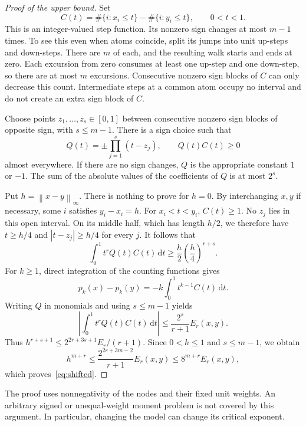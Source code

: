 \documentclass[11pt,a4paper]{article}
\numberwithin{equation}{section}
\theoremstyle{definition}
\theoremstyle{remark}
\newcommand{\dd}{\,\mathrm d}
\newcommand{\norm}[1]{\left\lVert#1\right\rVert}
\newcommand{\abs}[1]{\left|#1\right|}
\begin{document}
\begin{proof}[Proof of the upper bound]
Set
\[
 C(t)=\#\{i:x_i\le t\}-\#\{i:y_i\le t\},\qquad 0<t<1.
\]
This is an integer-valued step function. Its nonzero sign changes at most
$m-1$ times. To see this even when atoms coincide, split its jumps into unit
up-steps and down-steps. There are $m$ of each, and the resulting walk starts
and ends at zero. Each excursion from zero consumes at least one up-step and
one down-step, so there are at most $m$ excursions. Consecutive nonzero sign
blocks of $C$ can only decrease this count. Intermediate steps at a common
atom occupy no interval and do not create an extra sign block of $C$.

Choose points $z_1,\ldots,z_s\in[0,1]$ between consecutive nonzero sign blocks
of opposite sign, with $s\le m-1$. There is a sign choice such that
\[
 Q(t)=\pm\prod_{j=1}^s(t-z_j),\qquad Q(t)C(t)\ge0
\]
almost everywhere. If there are no sign changes, $Q$ is the appropriate
constant $1$ or $-1$. The sum of the absolute values of the coefficients of
$Q$ is at most $2^s$.

Put $h=\norm{x-y}_\infty$. There is nothing to prove for $h=0$. By interchanging
$x,y$ if necessary, some $i$ satisfies $y_i-x_i=h$. For $x_i<t<y_i$,
$C(t)\ge1$. No $z_j$ lies in this open interval. On its middle half, which
has length $h/2$, we therefore have $t\ge h/4$ and $|t-z_j|\ge h/4$ for every
$j$. It follows that
\begin{equation}
 \int_0^1 t^r Q(t)C(t)\dd t
 \ge \frac h2\left(\frac h4\right)^{r+s}.
 \label{eq:lowercount}
\end{equation}
For $k\ge1$, direct integration of the counting functions gives
\begin{equation}
 p_k(x)-p_k(y)=-k\int_0^1t^{k-1}C(t)\dd t.
 \label{eq:countmoment}
\end{equation}
Writing $Q$ in monomials and using $s\le m-1$ yields
\begin{equation}
 \abs{\int_0^1t^rQ(t)C(t)\dd t}
 \le\frac{2^s}{r+1}E_r(x,y).
\end{equation}
Thus $h^{r+s+1}\le 2^{2r+3s+1}E_r/(r+1)$. Since $0<h\le1$ and
$s\le m-1$, we obtain
\[
 h^{m+r}\le\frac{2^{2r+3m-2}}{r+1}E_r(x,y)
 \le8^{m+r}E_r(x,y),
\]
which proves~\eqref{eq:shifted}.
\end{proof}

The proof uses nonnegativity of the nodes and their fixed unit weights.
An arbitrary signed or unequal-weight moment problem is not covered by this
argument. In particular, changing the model can change its critical exponent.
\end{document}
